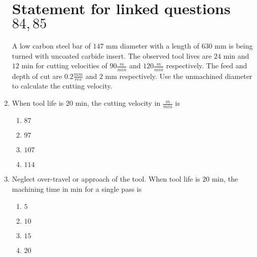 \documentclass[journal,12pt,twocolumn]{IEEEtran}
\theoremstyle{remark}
\begin{document}
\begin{enumerate}[start=69]
                            \section{Statement for linked questions$84 , 85$}
			 A low carbon steel bar of $147$ mm diameter with a length of $630$ mm is being turned with uncoated carbide insert. The observed tool lives are $24$ min and $12$ min for cutting velocities of $90 \frac{m}{min}$ and $120 \frac{m}{min}$ respectively. The feed and depth of cut are $0.2 \frac{mm}{rev}$ and $2$ mm respectively. Use the unmachined diameter to calculate the cutting velocity.
		 \item When tool life is $20$ min, the cutting velocity in $\frac{m}{min}$ is
                            \begin{enumerate}
                               \item  $87$ 
                               \item  $97$ 
                                \item $107$ 
                                \item $114$
                            \end{enumerate}
                        
                            \item Neglect over-travel or approach of the tool. When tool life is $20$ min, the machining time in min for a single pass is
                            \begin{enumerate}
                               \item  $5$
                                \item $10$ 
                                \item $15$ 
                                \item $20$
                            \end{enumerate}
                        \end{enumerate}
                        
\end{document}
